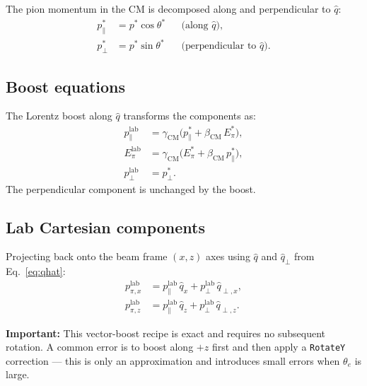 \documentclass[12pt,a4paper]{article}
\begin{document}
The pion momentum in the CM is decomposed along and perpendicular to $\hat{q}$:
\begin{align}
  p_\parallel^* &= p^* \cos\theta^*  && \text{(along } \hat{q}\text{)},\\
  p_\perp^*     &= p^* \sin\theta^*  && \text{(perpendicular to } \hat{q}\text{)}.
\end{align}

\subsection{Boost equations}

The Lorentz boost along $\hat{q}$ transforms the components as:
\begin{align}
  p_\parallel^\text{lab} &= \gamma_\text{CM}\bigl(p_\parallel^* + \beta_\text{CM}\,E_\pi^*\bigr),
  \label{eq:boost_par}\\
  E_\pi^\text{lab}       &= \gamma_\text{CM}\bigl(E_\pi^* + \beta_\text{CM}\,p_\parallel^*\bigr),
  \label{eq:boost_E}\\
  p_\perp^\text{lab}     &= p_\perp^*.
  \label{eq:boost_perp}
\end{align}
The perpendicular component is unchanged by the boost.

\subsection{Lab Cartesian components}

Projecting back onto the beam frame $(x,z)$ axes using $\hat{q}$ and
$\hat{q}_\perp$ from Eq.~\eqref{eq:qhat}:
\begin{align}
  p_{\pi,x}^\text{lab} &= p_\parallel^\text{lab}\,\hat{q}_x
                          + p_\perp^\text{lab}\,\hat{q}_{\perp,x},
  \label{eq:ppix}\\
  p_{\pi,z}^\text{lab} &= p_\parallel^\text{lab}\,\hat{q}_z
                          + p_\perp^\text{lab}\,\hat{q}_{\perp,z}.
  \label{eq:ppiz}
\end{align}

\begin{importantbox}
\textbf{Important:} This vector-boost recipe is exact and requires no
subsequent rotation. A common error is to boost along $+z$ first and then
apply a \texttt{RotateY} correction --- this is only an approximation and
introduces small errors when $\theta_e$ is large.
\end{importantbox}

\end{document}
